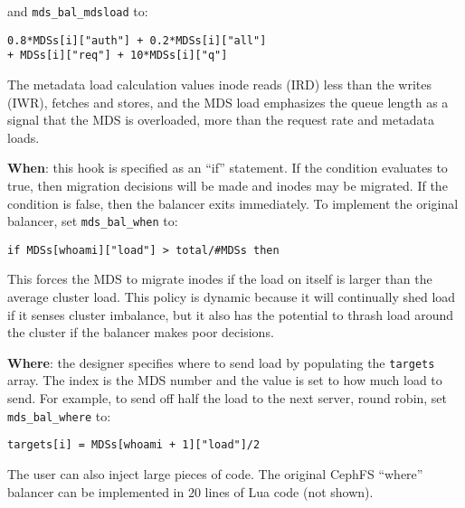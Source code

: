 \noindent and \texttt{mds\_bal\_mdsload} to:

{\small\begin{verbatim}
0.8*MDSs[i]["auth"] + 0.2*MDSs[i]["all"]
+ MDSs[i]["req"] + 10*MDSs[i]["q"]
\end{verbatim}}

The metadata load calculation values inode reads (IRD) less than the writes (IWR), fetches and stores, and the MDS load emphasizes the queue length as a signal that the MDS is overloaded, more than the request rate and metadata loads. 

\textbf{When}: this hook is specified as an ``if'' statement. If the condition evaluates to true, then migration decisions will be made and inodes may be migrated. If the condition is false, then the balancer exits immediately. To implement the original balancer, set \texttt{mds\_bal\_when} to:

{\small\begin{verbatim}
if MDSs[whoami]["load"] > total/#MDSs then
\end{verbatim}}

This forces the MDS to migrate inodes if the load on itself is larger than the average cluster load. This policy is dynamic because it will continually shed load if it senses cluster imbalance, but it also has the potential to thrash load around the cluster if the balancer makes poor decisions. 

\textbf{Where}: the designer specifies where to send load by populating the \texttt{targets} array. The index is the MDS number and the value is set to how much load to send. For example, to send off half the load to the next server, round robin, set \texttt{mds\_bal\_where} to:

{\small\begin{verbatim}
targets[i] = MDSs[whoami + 1]["load"]/2
\end{verbatim}}

The user can also inject large pieces of code. The original CephFS ``where'' balancer can be implemented in 20 lines of Lua code (not shown). 

